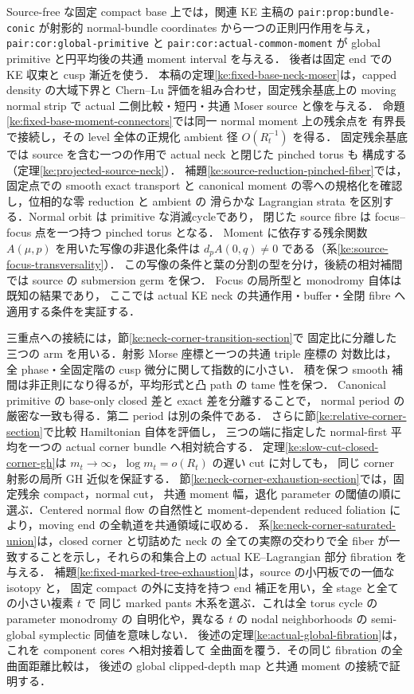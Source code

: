 Source-free な固定 compact base 上では，関連 KE 主稿\cite{KELocalCurrent}の
\texttt{pair:prop:bundle-conic} が射影的 normal-bundle coordinates から一つの正則円作用を与え，
\texttt{pair:cor:global-primitive} と \texttt{pair:cor:actual-common-moment} が
global primitive と円平均後の共通 moment interval を与える．
後者は固定 end での KE 収束と cusp 漸近を使う．
本稿の定理\ref{ke:fixed-base-neck-moser}は，capped density の大域下界と
Chern--Lu 評価を組み合わせ，固定残余基底上の moving normal strip で
actual 二側比較・短円・共通 Moser source と像を与える．
命題\ref{ke:fixed-base-moment-connectors}では同一 normal moment 上の残余点を
有界長で接続し，その level 全体の正規化 ambient 径 $O(R_t^{-1})$ を得る．
固定残余基底では source を含む一つの作用で actual neck と閉じた pinched torus も
構成する（定理\ref{ke:projected-source-neck}）．
補題\ref{ke:source-reduction-pinched-fiber}では，固定点での smooth exact transport と
canonical moment の零への規格化を確認し，位相的な零 reduction と ambient の
滑らかな Lagrangian strata を区別する．Normal orbit は primitive な消滅cycleであり，
閉じた source fibre は focus--focus 点を一つ持つ pinched torus となる．
Moment に依存する残余関数 $A(\mu,p)$ を用いた写像の非退化条件は
$d_pA(0,q)\ne0$ である（系\ref{ke:source-focus-transversality}）．
この写像の条件と葉の分割の型を分け，後続の相対補間では source の submersion germ を保つ．
Focus の局所型と monodromy 自体は既知の結果\cite[\S\S2--4]{ZungFocus}であり，
ここでは actual KE neck の共通作用・buffer・全閉 fibre へ適用する条件を実証する．

三重点への接続には，節\ref{ke:neck-corner-transition-section}で
固定比に分離した三つの arm を用いる．射影 Morse 座標と一つの共通 triple 座標の
対数比は，全 phase・全固定階の cusp 微分に関して指数的に小さい．
積を保つ smooth 補間は非正則になり得るが，平均形式と凸 path の tame 性を保つ．
Canonical primitive の base-only closed 差と exact 差を分離することで，
normal period の厳密な一致も得る．第二 period は別の条件である．
さらに節\ref{ke:relative-corner-section}で比較 Hamiltonian 自体を評価し，
三つの端に指定した normal-first 平均を一つの actual corner bundle へ相対統合する．
定理\ref{ke:slow-cut-closed-corner-gh}は
$m_t\to\infty$，$\log m_t=o(R_t)$ の遅い cut に対しても，
同じ corner 射影の局所 GH 近似を保証する．
節\ref{ke:neck-corner-exhaustion-section}では，固定残余 compact，normal cut，
共通 moment 幅，退化 parameter の閾値の順に選ぶ．Centered normal flow の自然性と
moment-dependent reduced foliation により，moving end の全軌道を共通領域に収める．
系\ref{ke:neck-corner-saturated-union}は，closed corner と切詰めた neck の
全ての実際の交わりで全 fiber が一致することを示し，それらの和集合上の
actual KE--Lagrangian 部分 fibration を与える．
補題\ref{ke:fixed-marked-tree-exhaustion}は，source の小円板での一価な isotopy と，
固定 compact の外に支持を持つ end 補正を用い，全 stage と全ての小さい複素 $t$ で
同じ marked pants 木系を選ぶ．これは全 torus cycle の parameter monodromy の
自明化や，異なる $t$ の nodal neighborhoods の semi-global symplectic 同値を意味しない．
後述の定理\ref{ke:actual-global-fibration}は，これを component cores へ相対接着して
全曲面を覆う．その同じ fibration の全曲面距離比較は，
後述の global clipped-depth map と共通 moment の接続で証明する．

